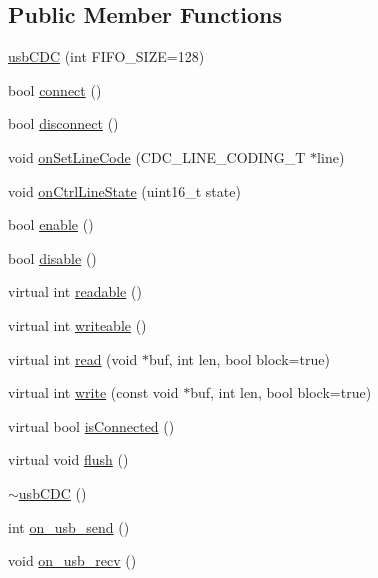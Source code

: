 \subsection*{Public Member Functions}
\begin{DoxyCompactItemize}
\item 
\hyperlink{classusb_c_d_c_a6eb4d9401ac17bab0bfb869bf6fc6315}{usb\-C\-D\-C} (int F\-I\-F\-O\-\_\-\-S\-I\-Z\-E=128)
\item 
bool \hyperlink{classusb_c_d_c_a49d431de50da7ccacf91ef33b04e99d2}{connect} ()
\item 
bool \hyperlink{classusb_c_d_c_aa95f819926a8da40f12eebc62adf6f95}{disconnect} ()
\item 
void \hyperlink{classusb_c_d_c_a15d235836f03a59a8d3a12ad5df78cd7}{on\-Set\-Line\-Code} (C\-D\-C\-\_\-\-L\-I\-N\-E\-\_\-\-C\-O\-D\-I\-N\-G\-\_\-\-T $\ast$line)
\item 
void \hyperlink{classusb_c_d_c_ad20e467624da633a79b150a435667619}{on\-Ctrl\-Line\-State} (uint16\-\_\-t state)
\item 
bool \hyperlink{classusb_c_d_c_a806fa3a4be9e6cfaab51b8621cb70697}{enable} ()
\item 
bool \hyperlink{classusb_c_d_c_a7ded774547bd49ca5f73257914a1f1f9}{disable} ()
\item 
virtual int \hyperlink{classusb_c_d_c_a7182c4dfdad0293bba73a82056d43e80}{readable} ()
\item 
virtual int \hyperlink{classusb_c_d_c_ae45acb09392fedde912a5dba6fc3b88a}{writeable} ()
\item 
virtual int \hyperlink{classusb_c_d_c_a65831ad4bfa85bf83f467c63b9f22799}{read} (void $\ast$buf, int len, bool block=true)
\item 
virtual int \hyperlink{classusb_c_d_c_a340c728ca722a61a3a457a546a301dec}{write} (const void $\ast$buf, int len, bool block=true)
\item 
virtual bool \hyperlink{classusb_c_d_c_a0c0cb27d108bed8763e68a4121efee32}{is\-Connected} ()
\item 
virtual void \hyperlink{classusb_c_d_c_afebca0ce341d46537cc6e2a811bede72}{flush} ()
\item 
\hyperlink{classusb_c_d_c_a6cb0b7368918527f61c4f47d67090ecd}{$\sim$usb\-C\-D\-C} ()
\item 
int \hyperlink{classusb_c_d_c_abbbc7fbe6d45daa397f1fe796ce28d97}{on\-\_\-usb\-\_\-send} ()
\item 
void \hyperlink{classusb_c_d_c_a7b1bd30708c95c47753461f865439cbb}{on\-\_\-usb\-\_\-recv} ()
\end{DoxyCompactItemize}

